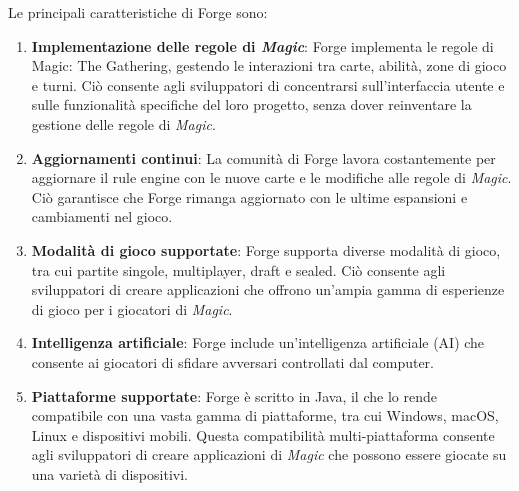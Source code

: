 Le principali caratteristiche di Forge sono:

\begin{enumerate}[label=\alph*.]
    \item \textbf{Implementazione delle regole di \emph{Magic}}: Forge implementa le regole di Magic: The Gathering, gestendo le interazioni tra carte, abilità, zone di gioco e turni. Ciò consente agli sviluppatori di concentrarsi sull'interfaccia utente e sulle funzionalità specifiche del loro progetto, senza dover reinventare la gestione delle regole di \emph{Magic}.

    \item \textbf{Aggiornamenti continui}: La comunità di Forge lavora costantemente per aggiornare il rule engine con le nuove carte e le modifiche alle regole di \emph{Magic}. Ciò garantisce che Forge rimanga aggiornato con le ultime espansioni e cambiamenti nel gioco.
    
    \item \textbf{Modalità di gioco supportate}: Forge supporta diverse modalità di gioco, tra cui partite singole, multiplayer, draft e sealed. Ciò consente agli sviluppatori di creare applicazioni che offrono un'ampia gamma di esperienze di gioco per i giocatori di \emph{Magic}.
    
    \item \textbf{Intelligenza artificiale}: Forge include un'intelligenza artificiale (AI) che consente ai giocatori di sfidare avversari controllati dal computer. %
    
    \item \textbf{Piattaforme supportate}: Forge è scritto in Java, il che lo rende compatibile con una vasta gamma di piattaforme, tra cui Windows, macOS, Linux e dispositivi mobili. Questa compatibilità multi-piattaforma consente agli sviluppatori di creare applicazioni di \emph{Magic} che possono essere giocate su una varietà di dispositivi.

\end{enumerate}
